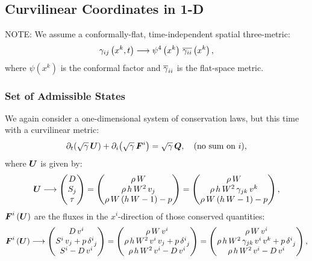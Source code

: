 \documentclass[10pt,preprint]{aastex}
\begin{document}
\newpage


\subsection{Curvilinear Coordinates in 1-D}
NOTE: We assume a conformally-flat, time-independent spatial three-metric:
\begin{equation}
    \gamma_{ij}\left(x^{k},t\right)\longrightarrow\psi^{4}\left(x^{k}\right)\,\ol{\gamma_{ii}}\left(x^{k}\right),
\end{equation}
where $\psi\left(x^{k}\right)$ is the conformal factor and $\ol{\gamma}_{ii}$ is the flat-space metric.

\subsubsection{Set of Admissible States}
We again consider a one-dimensional system of conservation laws, but this time with a curvilinear metric:
\begin{equation}\label{Eq:1DCurvilinearConsLaw}
    \pd{\left(\sqrtgm\,\bU\right)}{t}+\pd{\left(\sqrtgm\,\bF^{i}\right)}{i}=\sqrtgm\,\bQ,\hspace{1em}\text{(no sum on $i$)},
\end{equation}
where $\bU$ is given by:
\begin{equation}
    \bU\longrightarrow\begin{pmatrix} D\\ S_{j}\\ \tau\end{pmatrix}=\begin{pmatrix} \rho\,W\\ \rho\,h\,W^{2}\,v_{j}\\ \rho\,W\left(h\,W-1\right)-p\end{pmatrix}=\begin{pmatrix} \rho\,W\\ \rho\,h\,W^{2}\,\gamma_{jk}\,v^{k}\\ \rho\,W\left(h\,W-1\right)-p\end{pmatrix},
\end{equation}
$\bF^{i}\left(\bU\right)$ are the fluxes in the $x^{i}$-direction of those conserved quantities:
\begin{equation}
    \bF^{i}\left(\bU\right)\longrightarrow\begin{pmatrix}D\,v^{i}\\ S^{i}\,v_{j}+p\,\delta^{i}_{~j}\\ S^{i}-D\,v^{i}\end{pmatrix}=\begin{pmatrix}\rho\,W\,v^{i}\\ \rho\,h\,W^{2}\,v^{i}\,v_{j}+p\,\delta^{i}_{~j}\\\rho\,h\,W^{2}\,v^{i}-D\,v^{i}\end{pmatrix}=\begin{pmatrix}\rho\,W\,v^{i}\\ \rho\,h\,W^{2}\,\gamma_{jk}\,v^{i}\,v^{k}+p\,\delta^{i}_{~j}\\\rho\,h\,W^{2}\,v^{i}-D\,v^{i}\end{pmatrix},
\end{equation}
\end{document}
